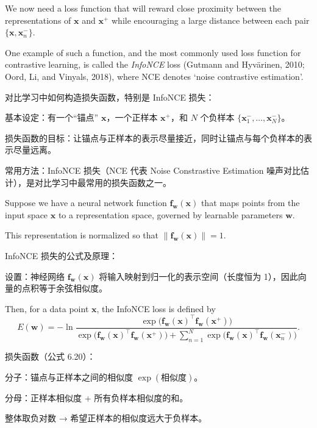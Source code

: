 \documentclass{article}
\begin{document}
We now need a loss function that will reward close proximity between the representations of $\mathbf{x}$ and $\mathbf{x}^+$ while encouraging a large distance between each pair $\{\mathbf{x}, \mathbf{x}_n^-\}$. 

One example of such a function, and the most commonly used loss function for contrastive learning, is called the \emph{InfoNCE} loss (Gutmann and Hyv\"arinen, 2010; Oord, Li, and Vinyals, 2018), where NCE denotes `noise contrastive estimation'. 

{\color{red}
对比学习中如何构造损失函数，特别是 InfoNCE 损失：

基本设定：有一个“锚点” \(\mathbf{x}\)，一个正样本 \(\mathbf{x}^+\)，和 \(N\) 个负样本 \(\{\mathbf{x}_1^-, \dots, \mathbf{x}_N^-\}\)。

损失函数的目标：让锚点与正样本的表示尽量接近，同时让锚点与每个负样本的表示尽量远离。

常用方法：InfoNCE 损失（NCE 代表 Noise Constrastive Estimation 噪声对比估计），是对比学习中最常用的损失函数之一。
}

Suppose we have a neural network function $\mathbf{f}_{\mathbf{w}}(\mathbf{x})$ that maps points from the input space $\mathbf{x}$ to a representation space, governed by learnable parameters $\mathbf{w}$. 

This representation is normalized so that $\|\mathbf{f}_{\mathbf{w}}(\mathbf{x})\| = 1$. 

{\color{red}
InfoNCE 损失的公式及原理：

设置：神经网络 \(\mathbf{f}_{\mathbf{w}}(\mathbf{x})\) 将输入映射到归一化的表示空间（长度恒为 1），因此向量的点积等于余弦相似度。

}

Then, for a data point $\mathbf{x}$, the InfoNCE loss is defined by
\begin{equation}
    E(\mathbf{w}) = -\ln \frac{
        \exp\bigl(\mathbf{f}_{\mathbf{w}}(\mathbf{x})^\top \mathbf{f}_{\mathbf{w}}(\mathbf{x}^+)\bigr)
    }{
        \exp\bigl(\mathbf{f}_{\mathbf{w}}(\mathbf{x})^\top \mathbf{f}_{\mathbf{w}}(\mathbf{x}^+)\bigr) + \sum_{n=1}^{N} \exp\bigl(\mathbf{f}_{\mathbf{w}}(\mathbf{x})^\top \mathbf{f}_{\mathbf{w}}(\mathbf{x}_n^-)\bigr)
    }.
    \tag{6.20}
\end{equation}

{\color{red}
损失函数（公式 6.20）：

分子：锚点与正样本之间的相似度 \(\exp(\text{相似度})\)。

分母：正样本相似度 + 所有负样本相似度的和。

整体取负对数 → 希望正样本的相似度远大于负样本。

}
\end{document}
